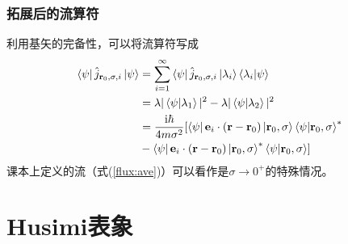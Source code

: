 \documentclass[UTF8]{beamer}
\begin{document}
\begin{frame}
    \frametitle{拓展后的流算符}
    利用基矢的完备性，可以将流算符写成
    \begin{align}
        \bra{\psi}\hat{j}_{\mathbf{r}_0,\sigma,i}\ket{\psi}&=\sum_{i=1}^\infty
        \bra{\psi}\hat{j}_{\mathbf{r}_0,\sigma,i}\ket{\lambda_i}\braket{\lambda_i|\psi}\\
        &=\lambda | \braket{\psi|\lambda_1}|^2-\lambda|\braket{\psi|\lambda_2}|^2\\
        &=\frac{\mathrm{i}\hbar}{4m\sigma^2}[\bra{\psi}\mathbf{e}_i\cdot(\mathbf{r}-\mathbf{r}_0)\ket{\mathbf{r}_0,\sigma}\braket{\psi|\mathbf{r}_0,\sigma}^{*}\nonumber
        \\&-\bra{\psi}\mathbf{e}_i\cdot(\mathbf{r}-\mathbf{r}_0)\ket{\mathbf{r}_0,\sigma}^{*}\braket{\psi|\mathbf{r}_0,\sigma}]
    \end{align}
    课本上定义的流（式(\ref{flux:ave})）可以看作是$\sigma\rightarrow0^{+}$的特殊情况。
\end{frame}
%
\section{Husimi表象}
\end{document}
